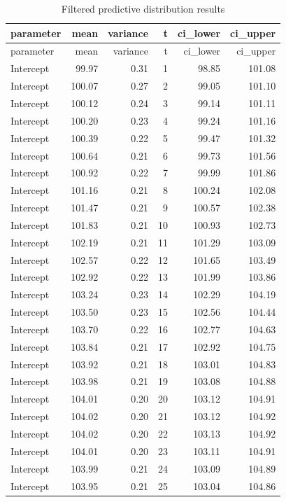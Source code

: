 \documentclass[
]{article}
\begin{document}
\begin{longtable}[]{@{}lrrrrr@{}}
\caption{Filtered predictive distribution results}\tabularnewline
\toprule
parameter & mean & variance & t & ci\_lower & ci\_upper \\
\midrule
\endfirsthead
\toprule
parameter & mean & variance & t & ci\_lower & ci\_upper \\
\midrule
\endhead
Intercept & 99.97 & 0.31 & 1 & 98.85 & 101.08 \\
Intercept & 100.07 & 0.27 & 2 & 99.05 & 101.10 \\
Intercept & 100.12 & 0.24 & 3 & 99.14 & 101.11 \\
Intercept & 100.20 & 0.23 & 4 & 99.24 & 101.16 \\
Intercept & 100.39 & 0.22 & 5 & 99.47 & 101.32 \\
Intercept & 100.64 & 0.21 & 6 & 99.73 & 101.56 \\
Intercept & 100.92 & 0.22 & 7 & 99.99 & 101.86 \\
Intercept & 101.16 & 0.21 & 8 & 100.24 & 102.08 \\
Intercept & 101.47 & 0.21 & 9 & 100.57 & 102.38 \\
Intercept & 101.83 & 0.21 & 10 & 100.93 & 102.73 \\
Intercept & 102.19 & 0.21 & 11 & 101.29 & 103.09 \\
Intercept & 102.57 & 0.22 & 12 & 101.65 & 103.49 \\
Intercept & 102.92 & 0.22 & 13 & 101.99 & 103.86 \\
Intercept & 103.24 & 0.23 & 14 & 102.29 & 104.19 \\
Intercept & 103.50 & 0.23 & 15 & 102.56 & 104.44 \\
Intercept & 103.70 & 0.22 & 16 & 102.77 & 104.63 \\
Intercept & 103.84 & 0.21 & 17 & 102.92 & 104.75 \\
Intercept & 103.92 & 0.21 & 18 & 103.01 & 104.83 \\
Intercept & 103.98 & 0.21 & 19 & 103.08 & 104.88 \\
Intercept & 104.01 & 0.20 & 20 & 103.12 & 104.91 \\
Intercept & 104.02 & 0.20 & 21 & 103.12 & 104.92 \\
Intercept & 104.02 & 0.20 & 22 & 103.13 & 104.92 \\
Intercept & 104.01 & 0.20 & 23 & 103.11 & 104.91 \\
Intercept & 103.99 & 0.21 & 24 & 103.09 & 104.89 \\
Intercept & 103.95 & 0.21 & 25 & 103.04 & 104.86 \\

\end{longtable}
\end{document}

